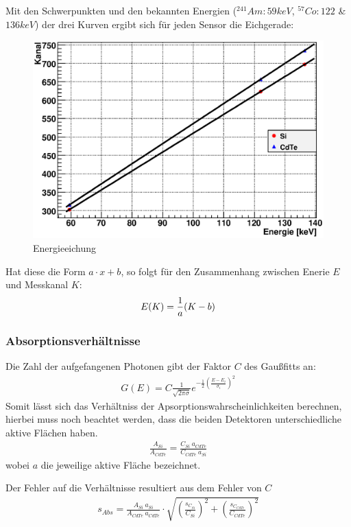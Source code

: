 \documentclass[12pt]{article}
\begin{document}
Mit den Schwerpunkten und den bekannten Energien ($^{241}Am:59keV$, $^{57}Co:122$ \& $136keV$) der drei Kurven ergibt sich für jeden Sensor die Eichgerade:
\begin{figure}[H]
\centering
\includegraphics[width=0.9\linewidth]{../plot/eps/gamma/finalfit.eps}
\caption{Energieeichung}
\end{figure}
Hat diese die Form $a \cdot x + b$, so folgt für den Zusammenhang zwischen Enerie $E$ und Messkanal $K$:
\begin{align}
 \notag	E(K) = \frac{1}{a}(K-b)
\end{align}


\subsubsection{Absorptionsverhältnisse}
Die Zahl der aufgefangenen Photonen gibt der Faktor $C$ des Gaußfitts an:
\begin{align*}
 G(E) = C \frac{1}{\sqrt{2 \pi \sigma}} e^{-\frac{1}{2}\left(\frac{E-E_i}{\sigma_i}\right)^2}
\end{align*}
Somit lässt sich das Verhältniss der Apsorptionswahrscheinlichkeiten berechnen, hierbei muss noch beachtet werden, dass die beiden Detektoren unterschiedliche aktive Flächen haben.
\begin{align*}
 \frac{A_{Si}}{A_{CdTe}} = \frac{C_{Si}~a_{CdTe}}{C_{CdTe}~a_{Si}}
\end{align*}
wobei $a$ die jeweilige aktive Fläche bezeichnet.

Der Fehler auf die Verhältnisse resultiert aus dem Fehler von $C$
\begin{align*}
 s_{Abs} = \frac{A_{Si}~a_{Si}}{A_{CdTe}~a_{CdTe}} \cdot \sqrt{\left(\frac{s_{C_{Si}}}{C_{Si}}\right)^2 + \left(\frac{s_{C_{CdTe}}}{C_{CdTe}}\right)^2}
\end{align*}
\end{document}

